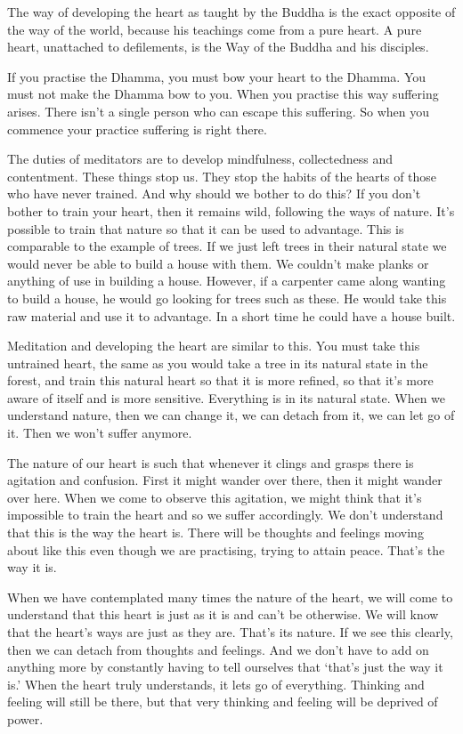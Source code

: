 The way of developing the heart as taught by the Buddha is the exact opposite of the way of the world, because his teachings come from a pure heart. A pure heart, unattached to defilements, is the Way of the Buddha and his disciples. 

If you practise the Dhamma, you must bow your heart to the Dhamma. You must not make the Dhamma bow to you. When you practise this way suffering arises. There isn't a single person who can escape this suffering. So when you commence your practice suffering is right there. 

The duties of meditators are to develop mindfulness, collectedness and contentment. These things stop us. They stop the habits of the hearts of those who have never trained. And why should we bother to do this? If you don't bother to train your heart, then it remains wild, following the ways of nature. It's possible to train that nature so that it can be used to advantage. This is comparable to the example of trees. If we just left trees in their natural state we would never be able to build a house with them. We couldn't make planks or anything of use in building a house. However, if a carpenter came along wanting to build a house, he would go looking for trees such as these. He would take this raw material and use it to advantage. In a short time he could have a house built. 

Meditation and developing the heart are similar to this. You must take this untrained heart, the same as you would take a tree in its natural state in the forest, and train this natural heart so that it is more refined, so that it's more aware of itself and is more sensitive. Everything is in its natural state. When we understand nature, then we can change it, we can detach from it, we can let go of it. Then we won't suffer anymore. 

The nature of our heart is such that whenever it clings and grasps there is agitation and confusion. First it might wander over there, then it might wander over here. When we come to observe this agitation, we might think that it's impossible to train the heart and so we suffer accordingly. We don't understand that this is the way the heart is. There will be thoughts and feelings moving about like this even though we are practising, trying to attain peace. That's the way it is. 

When we have contemplated many times the nature of the heart, we will come to understand that this heart is just as it is and can't be otherwise. We will know that the heart's ways are just as they are. That's its nature. If we see this clearly, then we can detach from thoughts and feelings. And we don't have to add on anything more by constantly having to tell ourselves that `that's just the way it is.' When the heart truly understands, it lets go of everything. Thinking and feeling will still be there, but that very thinking and feeling will be deprived of power. 

